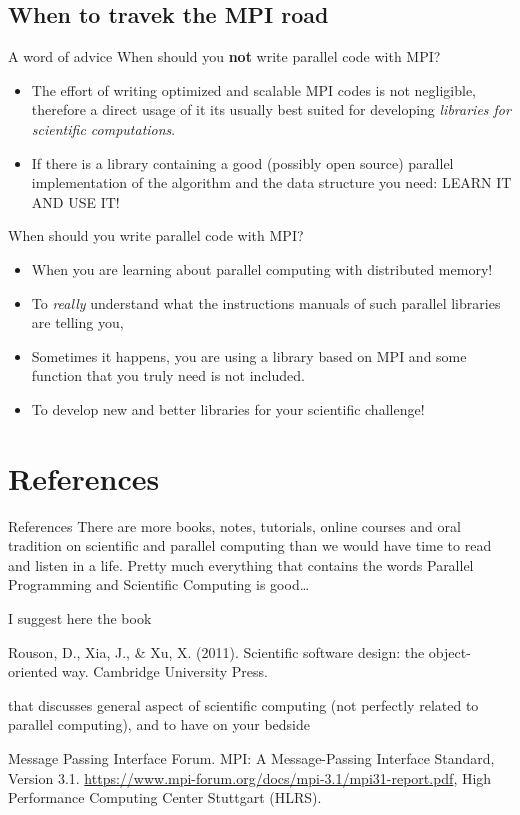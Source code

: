 \documentclass{beamer}
\begin{document}
\subsection{When to travek the MPI road}
\begin{frame}{A word of advice}
When should you \textbf{not} write parallel code with MPI?
\begin{itemize}
	\item<1-> The effort of writing optimized and scalable MPI codes is not negligible, therefore a direct usage of it its usually best suited for developing \emph{libraries for scientific computations}. 
	\item<2-> If there is a library containing a good (possibly open source) parallel implementation of the algorithm and the data structure you need: LEARN IT AND USE IT!
\end{itemize}
When should you write parallel code with MPI?
\begin{itemize}
	\item<3-> When you are learning about parallel computing with distributed memory!
	\item<4-> To \emph{really} understand what the instructions manuals of such parallel libraries are telling you,
	\item<5-> Sometimes it happens, you are using a library based on MPI and some function that you truly need is not included. 
	\item<6-> To develop new and better libraries for your scientific challenge!
\end{itemize}
\end{frame}

\section{References}

\begin{frame}{References}
There are more books, notes, tutorials, online courses and oral tradition on scientific and parallel computing than we would have time to read and listen in a life. Pretty much everything that contains the words Parallel Programming and Scientific Computing is good\ldots 

I suggest here the book
\begin{thebibliography}{10}
	 Rouson, D., Xia, J., \& Xu, X. (2011). Scientific software design: the object-oriented way. Cambridge University Press.
\end{thebibliography}
that discusses general aspect of scientific computing (not perfectly related to parallel computing), and to have on your bedside
\begin{thebibliography}{10}
	  Message Passing Interface Forum. MPI: A Message-Passing Interface Standard, Version 3.1. \url{https://www.mpi-forum.org/docs/mpi-3.1/mpi31-report.pdf}, High Performance Computing Center Stuttgart (HLRS).
\end{thebibliography}
\end{frame}
\end{document}
